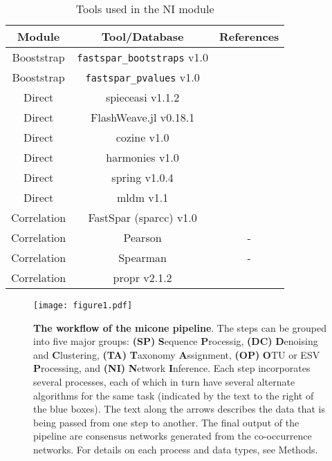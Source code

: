   \begin{table}[h]
    \centering
    \small
    \begin{tabular}{|c|c|c|}
      \hline
      \textbf{Module} & \textbf{Tool/Database} & \textbf{References} \\
      \hline
      Booststrap & \texttt{fastspar\_bootstraps} v1.0 & \cite{Watts2018} \\
      Booststrap & \texttt{fastspar\_pvalues} v1.0 & \cite{Watts2018} \\
      \hline
      Direct & \ac{spieceasi} v1.1.2 & \cite{Kurtz2015} \\
      Direct & FlashWeave.jl v0.18.1 & \cite{tackmannRapidInferenceDirect2019} \\
      Direct & \ac{cozine} v1.0 & \cite{haCompositionalZeroinflatedNetwork2020a} \\
      Direct & \ac{harmonies} v1.0 & \cite{jiangHARMONIESHybridApproach2020} \\
      Direct & \ac{spring} v1.0.4 & \cite{yoonMicrobialNetworksSPRING2019} \\
      Direct & \ac{mldm} v1.1 & \cite{Yang2017} \\
      \hline
      Correlation & FastSpar (\ac{sparcc}) v1.0 & \cite{Watts2018} \\
      Correlation & Pearson & - \\
      Correlation & Spearman & - \\
      Correlation & propr v2.1.2 & \cite{quinnProprRpackageIdentifying2017} \\
      \hline
    \end{tabular}
    \caption{Tools used in the NI module}
    \label{tab:ni_tools}
  \end{table}


  \FloatBarrier
  \newpage

  \begin{figure}
    \centering
    \texttt{[image: figure1.pdf]}
  \end{figure}
  \begin{figure}[h]
    \centering
    \caption{
      \textbf{The workflow of the \ac{micone} pipeline}.
      The steps can be grouped into five major groups: \textbf{(SP)} \textbf{S}equence \textbf{P}rocessig, \textbf{(DC)} \textbf{D}enoising and \textbf{C}lustering, \textbf{(TA)} \textbf{T}axonomy \textbf{A}ssignment, \textbf{(OP)} \textbf{O}TU or ESV \textbf{P}rocessing, and \textbf{(NI)} \textbf{N}etwork \textbf{I}nference.
      Each step incorporates several processes, each of which in turn have several alternate algorithms for the same task (indicated by the text to the right of the blue boxes).
      The text along the arrows describes the data that is being passed from one step to another.
      The final output of the pipeline are consensus networks generated from the co-occurrence networks.
      For details on each process and data types, see Methods.
    }
    \label{fig:figure1}
  \end{figure}


